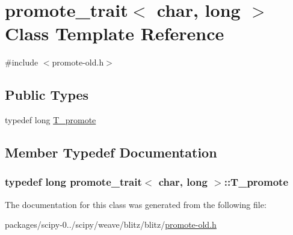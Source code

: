 \hypertarget{classpromote__trait_3_01char_00_01long_01_4}{}\section{promote\+\_\+trait$<$ char, long $>$ Class Template Reference}
\label{classpromote__trait_3_01char_00_01long_01_4}


{\ttfamily \#include $<$promote-\/old.\+h$>$}

\subsection*{Public Types}
\begin{DoxyCompactItemize}
\item 
typedef long \hyperlink{classpromote__trait_3_01char_00_01long_01_4_a1240c4ce60b94742c23d0e8a010ffcff}{T\+\_\+promote}
\end{DoxyCompactItemize}


\subsection{Member Typedef Documentation}
\hypertarget{classpromote__trait_3_01char_00_01long_01_4_a1240c4ce60b94742c23d0e8a010ffcff}{}
\subsubsection[{T\+\_\+promote}]{\setlength{\rightskip}{0pt plus 5cm}typedef long {\bf promote\+\_\+trait}$<$ char, long $>$\+::{\bf T\+\_\+promote}}\label{classpromote__trait_3_01char_00_01long_01_4_a1240c4ce60b94742c23d0e8a010ffcff}


The documentation for this class was generated from the following file\+:\begin{DoxyCompactItemize}
\item 
packages/scipy-\/0../scipy/weave/blitz/blitz/\hyperlink{promote-old_8h}{promote-\/old.\+h}\end{DoxyCompactItemize}
